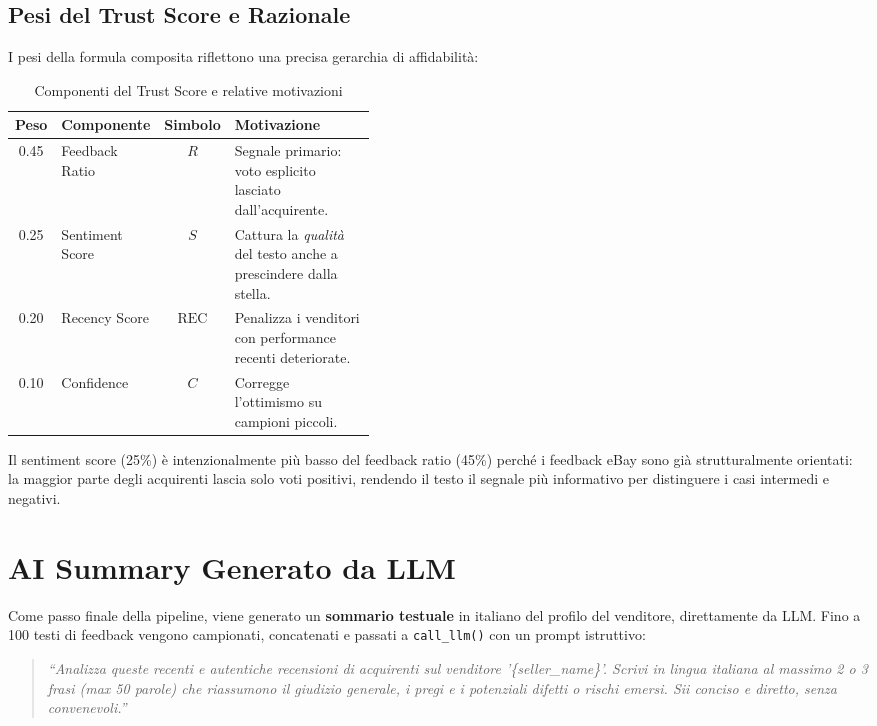 \subsection{Pesi del Trust Score e Razionale}
\label{subsec:trust-weights}

I pesi della formula composita riflettono una precisa gerarchia
di affidabilità:

\begin{table}[htbp]
\centering
\caption{Componenti del Trust Score e relative motivazioni}
\label{tab:trust-weights}
\begin{tabular}{clcp{0.42\linewidth}}
\hline
\textbf{Peso} & \textbf{Componente} & \textbf{Simbolo} & \textbf{Motivazione} \\
\hline
0.45 & Feedback Ratio   & $R$            & Segnale primario: voto esplicito lasciato dall'acquirente. \\
0.25 & Sentiment Score  & $S$            & Cattura la \emph{qualità} del testo anche a prescindere dalla stella. \\
0.20 & Recency Score    & $\text{REC}$   & Penalizza i venditori con performance recenti deteriorate. \\
0.10 & Confidence       & $C$            & Corregge l'ottimismo su campioni piccoli. \\
\hline
\end{tabular}
\end{table}

Il sentiment score (25\%) è intenzionalmente più basso del feedback
ratio (45\%) perché i feedback eBay sono già strutturalmente orientati:
la maggior parte degli acquirenti lascia solo voti positivi, rendendo
il testo il segnale più informativo per distinguere i casi intermedi
e negativi.


\section{AI Summary Generato da LLM}
\label{sec:seller-ai-summary}

Come passo finale della pipeline, viene generato un \textbf{sommario
testuale} in italiano del profilo del venditore, direttamente da LLM.
Fino a 100 testi di feedback vengono campionati, concatenati e passati
a \texttt{call\_llm()} con un prompt istruttivo:

\begin{quotation}
\textit{``Analizza queste recenti e autentiche recensioni di acquirenti
sul venditore '\{seller\_name\}'. Scrivi in lingua italiana al massimo
2 o 3 frasi (max 50 parole) che riassumono il giudizio generale, i
pregi e i potenziali difetti o rischi emersi. Sii conciso e diretto,
senza convenevoli.''}
\end{quotation}

